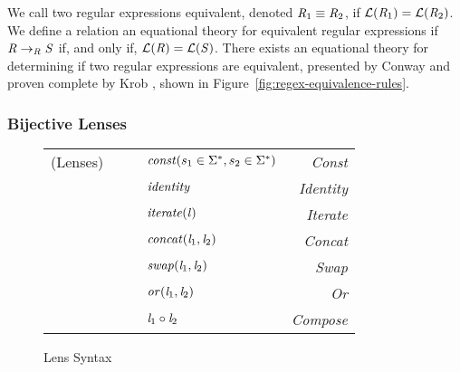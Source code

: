  We call two regular expressions equivalent, denoted $\mathit{R}_1\equiv\mathit{R}_2$,
if $\mathcal{L}(\mathit{R}_1)=\mathcal{L}(\mathit{R}_2)$.
We define a relation \Relation{} an equational theory for equivalent regular
expressions if $\mathit{R} \rightarrow_{\mathit{R}}{} \mathit{S}$ if, and only if,
$\mathcal{L}(\mathit{R}) = \mathcal{L}(\mathit{S})$.
There exists an equational theory for determining if two regular expressions are equivalent,
presented by Conway \cite{conway}
and proven complete by Krob \cite{Krob},
shown in Figure~\ref{fig:regex-equivalence-rules}.

\subsubsection{Bijective Lenses}

\begin{figure}
\centering
\begin{tabular}{l@{\ }l@{\ }c@{\ }l@{\ }>{\itshape\/}r}
(Lenses)& \Lens{} & \GEq{} & $\mathit{const}(s_1 \in \Sigma^*,s_2 \in \Sigma^*)$ & Const \\
& & & \GBar{} $\mathit{identity}$ & Identity\\
& & & \GBar{} $\mathit{iterate(\mathit{l})}$ & Iterate \\
& & & \GBar{} $\mathit{concat}(\mathit{l}_1,\mathit{l}_2)$ & Concat \\
& & & \GBar{} $\mathit{swap}(\mathit{l}_1,\mathit{l}_2)$ & Swap\\
& & & \GBar{} $\mathit{or}(\mathit{l}_1,\mathit{l}_2)$ & Or\\
& & & \GBar{} $\mathit{l}_1 \circ \mathit{l}_2$ & Compose\\
\end{tabular}
\caption{Lens Syntax}
\label{fig:lens-syntax}
\end{figure}


